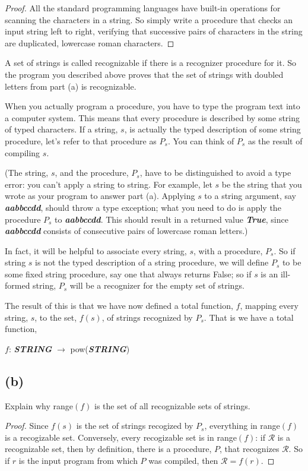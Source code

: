 \documentclass[14pt]{extarticle}
\newcommand{\str}[1]{\textit{\textbf{#1}}}
\begin{document}
\begin{proof}
All the standard programming languages have built-in operations for scanning the characters in a string. So simply write a procedure that checks an input string left to right, verify­ing that successive pairs of characters in the string are duplicated, lowercase roman characters.
\end{proof}

A set of strings is called recognizable if there is a recognizer procedure for it. So the program you described above proves that the set of strings with doubled letters from part (a) is recognizable.

When you actually program a procedure, you have to type the program text into a computer system. This means that every procedure is described by some string of typed characters. If a string, $s$, is actually the typed description of some string procedure, let’s refer to that procedure as $P_s$. You can think of $P_s$ as the result of compiling $s$.

(The string, $s$, and the procedure, $P_s$, have to be distinguished to avoid a type error: you can't apply a string to string. For example, let $s$ be the string that you wrote as your program to answer part (a). Applying $s$ to a string argument, say \str{aabbccdd}, should throw a type exception; what you need to do is apply the procedure $P_s$ to \str{aabbccdd}. This should result in a returned value \str{True}, since \str{aabbccdd} consists of consecutive pairs of lowercase roman letters.)

In fact, it will be helpful to associate every string, $s$, with a procedure, $P_s$. So if string $s$ is not the typed description of a string procedure, we will define $P_s$ to be some fixed string procedure, say one that always returns False; so if $s$ is an ill-formed string, $P_s$ will be a recognizer for the empty set of strings.

The result of this is that we have now defined a total function, $f$, mapping every string, $s$, to the set, $f(s)$, of strings recognized by $P_s$. That is we have a total function, 

\begin{center}
$f$: \str{STRING} $\to$ pow(\str{STRING})
\end{center}

\subsection{(b)}
Explain why range$(f)$ is the set of all recognizable sets of strings.
\begin{proof}
Since $f(s)$ is the set of strings recogized by $P_s$, everything in range$(f)$ is a recogizable set. Conversely, every recogizable set is in range$(f)$: if $\mathcal{R}$ is a recognizable set, then by definition, there is a procedure, $P$, that recognizes $\mathcal{R}$. So if $r$ is the input program from which $P$ was compiled, then $\mathcal{R} = f(r)$.
\end{proof}
\end{document}
